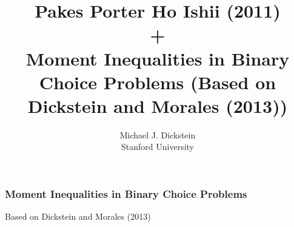 \documentclass[notes=show]{beamer}
\begin{document}
\title[Moment Inequalities]{Pakes Porter Ho Ishii (2011)\\ + \\Moment Inequalities in Binary Choice Problems (Based on Dickstein and Morales (2013))}
\author[MJ Dickstein]{Michael J. Dickstein \\
Stanford University}
\maketitle


\begin{frame}
\frametitle{Moment Inequalities in Binary Choice Problems}

Based on Dickstein and Morales (2013)

\end{frame}
\end{document}
